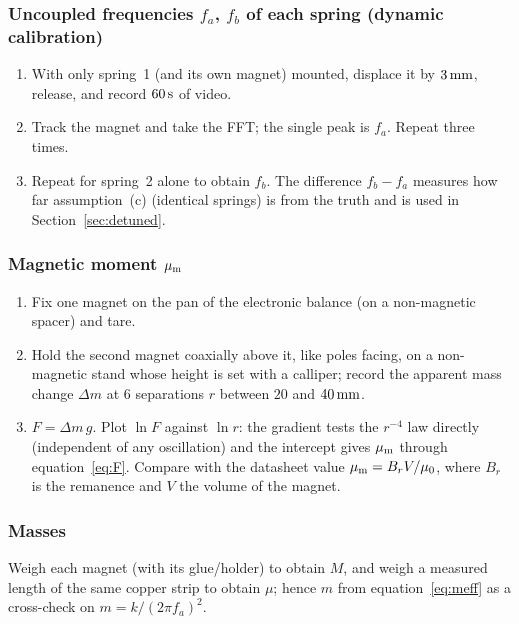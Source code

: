 \subsubsection{Uncoupled frequencies \texorpdfstring{$f_a$, $f_b$}{fa, fb} of each spring (dynamic calibration)}
\begin{enumerate}
\item With only spring~1 (and its own magnet) mounted, displace it by $3\,\mathrm{mm}$, release, and record $60\,\mathrm{s}$ of video.
\item Track the magnet and take the FFT; the single peak is $f_a$. Repeat three times.
\item Repeat for spring~2 alone to obtain $f_b$. The difference $f_b-f_a$ measures how far assumption~(c) (identical springs) is from the truth and is used in Section~\ref{sec:detuned}.
\end{enumerate}

\subsubsection{Magnetic moment \texorpdfstring{$\mu_{\mathrm m}$}{mu\_m}}
\begin{enumerate}
\item Fix one magnet on the pan of the electronic balance (on a non-magnetic spacer) and tare.
\item Hold the second magnet coaxially above it, like poles facing, on a non-magnetic stand whose height is set with a calliper; record the apparent mass change $\Delta m$ at 6 separations $r$ between $20$ and $40\,\mathrm{mm}$.
\item $F=\Delta m\,g$. Plot $\ln F$ against $\ln r$: the gradient tests the $r^{-4}$ law directly (independent of any oscillation) and the intercept gives $\mu_{\mathrm m}$ through equation~\eqref{eq:F}. Compare with the datasheet value $\mu_{\mathrm m}=B_rV/\mu_0$, where $B_r$ is the remanence and $V$ the volume of the magnet.
\end{enumerate}

\subsubsection{Masses}
Weigh each magnet (with its glue/holder) to obtain $M$, and weigh a measured length of the same copper strip to obtain $\mu$; hence $m$ from equation~\eqref{eq:meff} as a cross-check on $m=k/(2\pi f_a)^2$.

